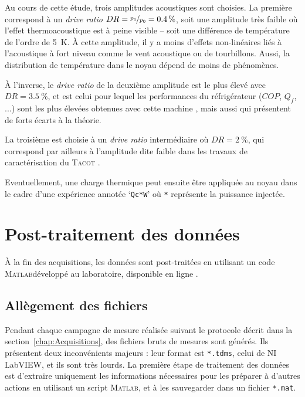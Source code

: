 Au cours de cette étude, trois amplitudes acoustiques sont choisies. La première correspond à un \textit{drive ratio} $DR=\nicefrac{p_1}{p_0}=\qty{.4}{\percent}$, soit une amplitude très faible où l'effet thermoacoustique est à peine visible -- soit une différence de température de l'ordre de \qty{5}{\kelvin}. À cette amplitude, il y a moins d'effets non-linéaires liés à l'acoustique à fort niveau comme le vent acoustique ou de tourbillons. Aussi, la distribution de température dans le noyau dépend de moins de phénomènes.

À l'inverse, le \textit{drive ratio} de la deuxième amplitude est le plus élevé avec $DR=\qty{3.5}{\percent}$, et est celui pour lequel les performances du réfrigérateur ($COP$, $Q_f$, ...) sont les plus élevées obtenues avec cette machine \cite{ramadan_design_2021}, mais aussi qui présentent de forts écarts à la théorie. 

La troisième est choisie à un \textit{drive ratio} intermédiaire où $DR=\qty{2}{\percent}$, qui correspond par ailleurs à l'amplitude dite \og faible \fg{} dans les travaux de caractérisation du \textsc{Tacot} \cite{ramadan_design_2021}. 


Eventuellement, une charge thermique peut ensuite être appliquée au noyau dans le cadre d'une expérience annotée `\texttt{Qc*W}' où \texttt{*} représente la puissance injectée. 

\section{Post-traitement des données}\label{chap:PostTraitement}
À la fin des acquisitions, les données sont post-traitées en utilisant un code \textsc{Matlab}\textss\textregistered développé au laboratoire, disponible en ligne \cite{fontbonne_postprocessing_2025}.

\subsection{Allègement des fichiers}
Pendant chaque campagne de mesure réalisée suivant le protocole décrit dans la section~\ref{chap:Acquisitions}, des fichiers bruts de mesures sont générés. Ils présentent deux inconvénients majeurs : leur format est \texttt{*.tdms}, celui de NI LabVIEW, et ils sont très lourds. La première étape de traitement des données est d'extraire uniquement les informations nécessaires pour les préparer à d'autres actions en utilisant un script \textsc{Matlab}\textss\textregistered, et à les sauvegarder dans un fichier \texttt{*.mat}.\medskip

